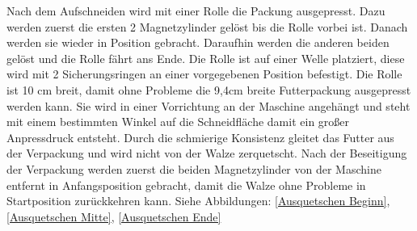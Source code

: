 Nach dem Aufschneiden wird mit einer Rolle die Packung ausgepresst. Dazu werden zuerst die ersten 2 Magnetzylinder gelöst bis die Rolle vorbei ist. Danach werden sie wieder in Position gebracht. Daraufhin werden die anderen beiden gelöst und die Rolle fährt ans Ende. Die Rolle ist auf einer Welle platziert, diese wird mit 2 Sicherungsringen an einer  vorgegebenen Position befestigt. Die Rolle ist 10 cm breit, damit ohne Probleme die 9,4cm breite Futterpackung ausgepresst werden kann. Sie wird in einer Vorrichtung an der Maschine angehängt und steht mit einem bestimmten Winkel auf die Schneidfläche damit ein großer Anpressdruck entsteht. Durch die schmierige Konsistenz gleitet das Futter aus der Verpackung und wird nicht von der Walze zerquetscht. Nach der Beseitigung der Verpackung werden zuerst die beiden Magnetzylinder von der Maschine entfernt in Anfangsposition gebracht, damit die Walze ohne Probleme in Startposition zurückkehren kann. Siehe Abbildungen: \ref{Ausquetschen Beginn}, \ref{Ausquetschen Mitte}, \ref{Ausquetschen Ende}



